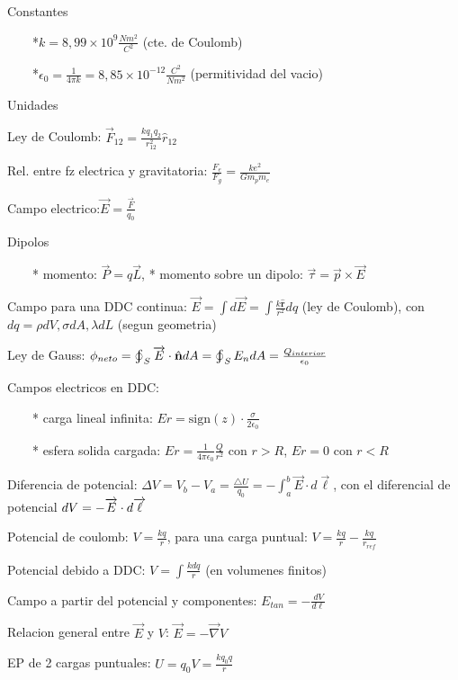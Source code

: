 \documentclass[10pt]{article}
\begin{document}
Constantes

$\qquad${*}$k=8,99\times10^{9}\frac{Nm^{2}}{C^{2}}$ (cte. de Coulomb)

$\qquad${*}$\epsilon_{0}=$$\frac{1}{4\pi k}=8,85\times10^{-12}\frac{C^{2}}{Nm^{2}}$
(permitividad del vacio)

Unidades


Ley de Coulomb: $\overrightarrow{F}_{12}=\frac{kq_{1}q_{2}}{r_{12}^{2}}\hat{r}_{12}$

Rel. entre fz electrica y gravitatoria: $\frac{F_{e}}{F_{g}}=\frac{ke^{2}}{Gm_{p}m_{e}}$

Campo electrico:$\overrightarrow{E}=\frac{\overrightarrow{F}}{q_{0}}$

Dipolos

$\qquad${*} momento: $\overrightarrow{P}=q\overrightarrow{L}$, {*} momento sobre un dipolo: $\overrightarrow{\tau}=\overrightarrow{p}\times\overrightarrow{E}$

Campo para una DDC continua: $\overrightarrow{E}=\int d\overrightarrow{E}=\int\frac{k\mathbf{\hat{r}}}{r^{2}}dq$
(ley de Coulomb), con $dq=\rho dV,\sigma dA,\lambda dL$ (segun geometria)

Ley de Gauss: $\phi_{neto}=\varoint_{S}\overrightarrow{E}\cdot\hat{\mathbf{n}}dA=\varoint_{S}E_{n}dA=\frac{Q_{interior}}{\epsilon_{0}}$

Campos electricos en DDC:

$\qquad${*} carga lineal infinita: $Er=\textrm{sign}(z)\cdot\frac{\sigma}{2\epsilon_{0}}$

$\qquad${*} esfera solida cargada: $Er=\frac{1}{4\pi\epsilon_{0}}\frac{Q}{r^{2}}$
con $r>R$, $Er=0$ con $r<R$

Diferencia de potencial: $\Delta V=V_{b}-V_{a}=\frac{\triangle U}{q_{0}}=-\int_{a}^{b}\overrightarrow{E}\cdot d\overrightarrow{\ell}$,
con el diferencial de potencial $dV=-\overrightarrow{E}\cdot d\overrightarrow{\text{\ensuremath{\ell}}}$

Potencial de coulomb: $V=\frac{kq}{r}$, para una carga puntual: $V=\frac{kq}{r}-\frac{kq}{r_{ref}}$

Potencial debido a DDC: $V=\int\frac{kdq}{r}$ (en volumenes finitos)

Campo a partir del potencial y componentes: $E_{tan}=-\frac{dV}{d\ell}$

Relacion general entre $\overrightarrow{E}$ y $V$: $\overrightarrow{E}=-\overrightarrow{\nabla}V$

EP de 2 cargas puntuales: $U=q_{0}V=\frac{kq_{0}q}{r}$
\end{document}
